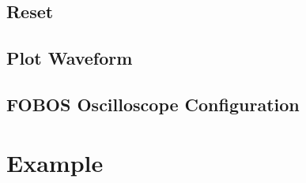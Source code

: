 \subsection{Reset}
\subsection{Plot Waveform}
\subsection{FOBOS Oscilloscope Configuration}

\section{Example}